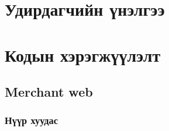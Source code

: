 
\appendix
{}

\chapter{Удирдагчийн үнэлгээ}
\chapter{Кодын хэрэгжүүлэлт}

\section{Merchant web}

\subsection{Нүүр хуудас}
\pagebreak